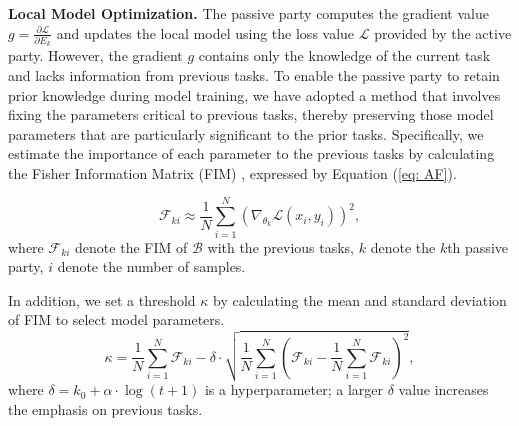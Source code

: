 \noindent\textbf{Local Model Optimization.}
The passive party computes the gradient value \(\textit{g} = \frac{\partial \mathcal{L}}{\partial E_k}\) and updates the local model using the loss value \(\mathcal{L}\) provided by the active party.
However, the gradient \( g \) contains only the knowledge of the current task and lacks information from previous tasks. To enable the passive party to retain prior knowledge during model training, we have adopted a method that involves fixing the parameters critical to previous tasks, thereby preserving those model parameters that are particularly significant to the prior tasks.
Specifically, we estimate the importance of each parameter to the previous tasks by calculating the Fisher Information Matrix (FIM) \cite{yang2023dynamic}, expressed by Equation (\ref{eq: AF}).

\begin{equation} \label{eq: AF}
    \mathcal{F}_{ki} \approx \frac{1}{N} \sum_{i=1}^{N}\left(\nabla_{\theta_{k}} \mathcal{L}\left(x_{i}, y_{i}\right)\right)^{2},
\end{equation}
where $\mathcal{F}_{ki}$ denote the FIM of $\mathcal{B}$ with the previous tasks, $k$ denote the $k$th passive party, $i$ denote the number of samples.

In addition, we set a threshold $\kappa$ by calculating the mean and standard deviation of FIM to select model parameters.
\begin{equation} \label{eq: thre}
    \kappa = \frac{1}{N} \sum_{i=1}^N \mathcal{F}_{ki} - \delta \cdot \sqrt{\frac{1}{N} \sum_{i=1}^N (\mathcal{F}_{ki} - \frac{1}{N} \sum_{i=1}^N \mathcal{F}_{ki})^2},
\end{equation}
where $\delta = k_0 + \alpha \cdot \log(t + 1)$ is a hyperparameter; a larger \(\delta\) value increases the emphasis on previous tasks.

